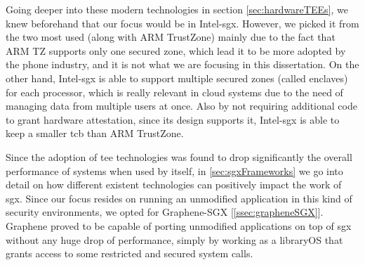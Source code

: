 Going deeper into these modern technologies in section \ref{sec:hardwareTEEs}, we knew beforehand that our focus would be in Intel-\gls{sgx}. However, we picked it from the two most used (along with ARM TrustZone) mainly due to the fact that ARM TZ supports only one secured zone, which lead it to be more adopted by the phone industry, and it is not what we are focusing in this dissertation. On the other hand, Intel-\gls{sgx} is able to support multiple secured zones (called enclaves) for each processor, which is really relevant in cloud systems due to the need of managing data from multiple users at once.
Also by not requiring additional code to grant hardware attestation, since its design supports it, Intel-\gls{sgx} is able to keep a smaller \gls{tcb} than ARM TrustZone.

Since the adoption of \gls{tee} technologies was found to drop significantly the overall performance of systems when used by itself, in \ref{sec:sgxFrameworks} we go into detail on how different existent technologies can positively impact the work of \gls{sgx}. Since our focus resides on running an unmodified application in this kind of security environments, we opted for Graphene-SGX [\ref{ssec:grapheneSGX}]. Graphene proved to be capable of porting unmodified applications on top of \gls{sgx} without any huge drop of performance, simply by working as a libraryOS that grants access to some restricted and secured system calls.








